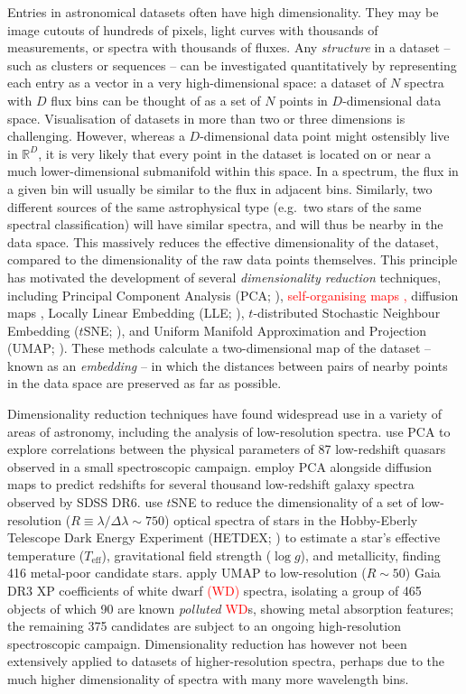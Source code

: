 \documentclass[fleqn,usenatbib]{mnras}
\def\Teff{T_\mathrm{eff}}
\newcommand{\red}[1]{\textcolor{red}{#1}}
\begin{document}
Entries in astronomical datasets often have high dimensionality.
They may be image cutouts of hundreds of pixels, light curves with thousands of measurements, or spectra with thousands of fluxes.
Any \textit{structure} in a dataset -- such as clusters or sequences -- can be investigated quantitatively by representing each entry as a vector in a very high-dimensional space: a dataset of $N$ spectra with $D$ flux bins can be thought of as a set of $N$ points in $D$-dimensional data space.
Visualisation of datasets in more than two or three dimensions is challenging.
However, whereas a $D$-dimensional data point might ostensibly live in $\mathbb{R}^D$, it is very likely that every point in the dataset is located on or near a much lower-dimensional submanifold within this space.
In a spectrum, the flux in a given bin will usually be similar to the flux in adjacent bins.
Similarly, two different sources of the same astrophysical type (e.g.\ two stars of the same spectral classification) will have similar spectra, and will thus be nearby in the data space.
This massively reduces the effective dimensionality of the dataset, compared to the dimensionality of the raw data points themselves.
This principle has motivated the development of several \textit{dimensionality reduction} techniques, including Principal Component Analysis (PCA; \citealt{pca}), \red{self-organising maps \citep{kohonen90},} diffusion maps \citep{coifman06, lafon06}, Locally Linear Embedding (LLE; \citealt{roweis00}), $t$-distributed Stochastic Neighbour Embedding ($t$SNE; \citealt{tsne}), and Uniform Manifold Approximation and Projection (UMAP; \citealt{umap}).
These methods calculate a two-dimensional map of the dataset -- known as an \textit{embedding} -- in which the distances between pairs of nearby points in the data space are preserved as far as possible.

Dimensionality reduction techniques have found widespread use in a variety of areas of astronomy, including the analysis of low-resolution spectra.
\citet{boroson92} use PCA to explore correlations between the physical parameters of 87 low-redshift quasars observed in a small spectroscopic campaign.
\citet{richards09} employ PCA alongside diffusion maps to predict redshifts for several thousand low-redshift galaxy spectra observed by SDSS DR6.
\citet{hawkins21} use $t$SNE to reduce the dimensionality of a set of low-resolution ($R\equiv \lambda / \Delta \lambda \sim750$) optical spectra of stars in the Hobby-Eberly Telescope Dark Energy Experiment (HETDEX; \citealt{gebhardt21}) to estimate a star's effective temperature ($\Teff$), gravitational field strength ($\log g$), and metallicity, finding 416 metal-poor candidate stars.
\citet{kao24} apply UMAP to low-resolution ($R\sim50$) Gaia DR3 XP coefficients of white dwarf \red{(WD)} spectra, isolating a group of 465 objects of which 90 are known \textit{polluted} \red{WD}s, showing metal absorption features; the remaining 375 candidates are subject to an ongoing high-resolution spectroscopic campaign.
Dimensionality reduction has however not been extensively applied to datasets of higher-resolution spectra, perhaps due to the much higher dimensionality of spectra with many more wavelength bins.
\end{document}
